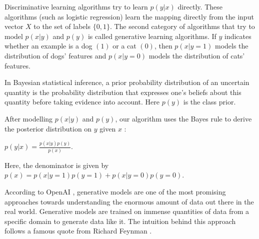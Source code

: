 \begin{onehalfspace}
    Discriminative learning algorithms try to learn \(p(y|x)\) directly. 
    These algorithms (such as logistic regression) learn 
    the mapping directly from the input vector \(X\) to the set of labels \(\{0,1\}\).
    The second category of algorithms that try to model \(p(x|y)\) and \(p(y)\) is 
    called generative learning algorithms. If \(y\) indicates whether an example is 
    a dog \((1)\) or a cat \((0)\),  then \(p(x|y = 1)\) models the distribution of dogs' 
    features and \(p(x|y = 0)\) models the distribution of cats' features.

    In Bayesian statistical inference, a prior probability distribution of an 
    uncertain quantity is the probability distribution that expresses one's 
    beliefs about this quantity before taking evidence into account. Here \(p(y)\) 
    is the class prior.

    After modelling \(p(x|y)\) and \(p(y)\), our algorithm uses the Bayes rule to 
    derive the posterior distribution on \(y\) given \(x\) \cite{ng2002discriminative} :
    \begin{center}
    \(p(y|x) = \frac{p(x|y)p(y)}{p(x)}\).    
    \end{center}
    
    Here, the denominator is given by \(p(x) = p(x|y = 1)p(y = 1) + 
    p(x|y = 0)p(y = 0)\).

    According to OpenAI \cite{openai_genmodels}, generative models are one of the most promising 
    approaches towards understanding the enormous amount of data out there in 
    the real world. Generative models are trained on immense quantities of data 
    from a specific domain to generate data like it. The intuition behind this 
    approach follows a famous quote from Richard Feynman
    \textit{} \cite{quote_rf}.




\end{onehalfspace}


